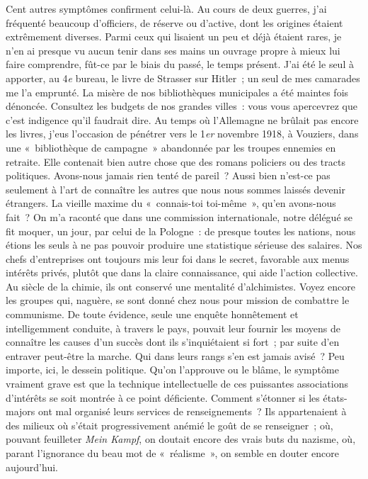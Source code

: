 \documentclass[french,twoside]{book} %
\begin{document}
Cent autres symptômes confirment celui-là. Au cours de deux guerres, j’ai fréquenté beaucoup d’officiers, de réserve ou d’active, dont les origines étaient extrêmement diverses. Parmi ceux qui lisaient un peu et déjà étaient rares, je n’en ai presque vu aucun tenir dans ses mains un ouvrage propre à mieux lui faire comprendre, fût-ce par le biais du passé, le temps présent. J’ai été le seul à apporter, au 4\emph{e} bureau, le livre de Strasser sur Hitler ; un seul de mes camarades me l’a emprunté. La misère de nos bibliothèques municipales a été maintes fois dénoncée. Consultez les budgets de nos grandes villes : vous vous apercevrez que c’est indigence qu’il faudrait dire. Au temps où l’Allemagne ne brûlait pas encore les livres, j’eus l’occasion de pénétrer vers le 1\emph{er} novembre 1918, à Vouziers, dans une « bibliothèque de campagne » abandonnée par les troupes ennemies en retraite. Elle contenait bien autre chose que des romans policiers ou des tracts politiques. Avons-nous jamais rien tenté de pareil ? Aussi bien n’est-ce pas seulement à l’art de connaître les autres que nous nous sommes laissés devenir étrangers. La vieille maxime du « connais-toi toi-même », qu’en avons-nous fait ? On m’a raconté que dans une commission internationale, notre délégué se fit moquer, un jour, par celui de la Pologne : de presque toutes les nations, nous étions les seuls à ne pas pouvoir produire une statistique sérieuse des salaires. Nos chefs d’entreprises ont toujours mis leur foi dans le secret, favorable aux menus intérêts privés, plutôt que dans la claire connaissance, qui aide l’action collective. Au siècle de la chimie, ils ont conservé une mentalité d’alchimistes. Voyez   encore les groupes qui, naguère, se sont donné chez nous pour mission de combattre le communisme. De toute évidence, seule une enquête honnêtement et intelligemment conduite, à travers le pays, pouvait leur fournir les moyens de connaître les causes d’un succès dont ils s’inquiétaient si fort ; par suite d’en entraver peut-être la marche. Qui dans leurs rangs s’en est jamais avisé ? Peu importe, ici, le dessein politique. Qu’on l’approuve ou le blâme, le symptôme vraiment grave est que la technique intellectuelle de ces puissantes associations d’intérêts se soit montrée à ce point déficiente. Comment s’étonner si les états-majors ont mal organisé leurs services de renseignements ? Ils appartenaient à des milieux où s’était progressivement anémié le goût de se renseigner ; où, pouvant feuilleter \emph{Mein Kampf}, on doutait encore des vrais buts du nazisme, où, parant l’ignorance du beau mot de « réalisme », on semble en douter encore aujourd’hui.\par
\end{document}
